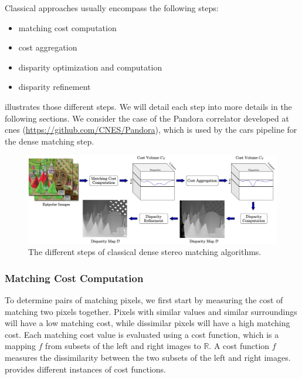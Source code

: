 Classical approaches usually encompass the following steps\cite{scharstein_taxonomy_2001}:
\begin{itemize}
    \item matching cost computation
    \item cost aggregation
    \item disparity optimization and computation
    \item disparity refinement
\end{itemize}
 illustrates those different steps. We will detail each step into more details in the following sections. We consider the case of the Pandora correlator developed at \acrshort{cnes} (\url{https://github.com/CNES/Pandora}), which is used by the \acrshort{cars} pipeline for the dense matching step.

\begin{figure}
	\centering
	\includegraphics[width=\linewidth]{Images/Chap_1/stereo-matching_pipeline.png}
	\caption{The different steps of classical dense stereo matching algorithms.}
	\label{fig:stereo_matching_pipeline}
\end{figure}

\subsubsection{Matching Cost Computation}\label{sec:cost_volume_computation}
To determine pairs of matching pixels, we first start by measuring the cost of matching two pixels together. Pixels with similar values and similar surroundings will have a low matching cost, while dissimilar pixels will have a high matching cost. Each matching cost value is evaluated using a cost function, which is a mapping $f$ from subsets of the left and right images to $\mathbb{R}$. A cost function $f$ measures the dissimilarity between the two subsets of the left and right images.  provides different instances of cost functions.

